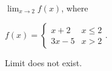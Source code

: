 {$\displaystyle \lim_{x\to 2} f(x)$, where 

$f(x) = \left\{\begin{array}{cl} x+2 & x\leq 2 \\ 3x-5 & x>2 \end{array}\right.$.
}
{Limit does not exist.}


